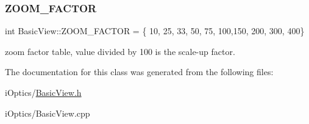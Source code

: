 \subsubsection{\texorpdfstring{Z\+O\+O\+M\+\_\+\+F\+A\+C\+T\+OR}{ZOOM\_FACTOR}}
{\footnotesize\ttfamily int Basic\+View\+::\+Z\+O\+O\+M\+\_\+\+F\+A\+C\+T\+OR = \{ 10, 25, 33, 50, 75, 100,150, 200, 300, 400\}\hspace{0.3cm}{\ttfamily [static]}}

zoom factor table, value divided by 100 is the scale-\/up factor. 

The documentation for this class was generated from the following files\+:\begin{DoxyCompactItemize}
\item 
i\+Optics/\mbox{\hyperlink{_basic_view_8h}{Basic\+View.\+h}}\item 
i\+Optics/Basic\+View.\+cpp\end{DoxyCompactItemize}
